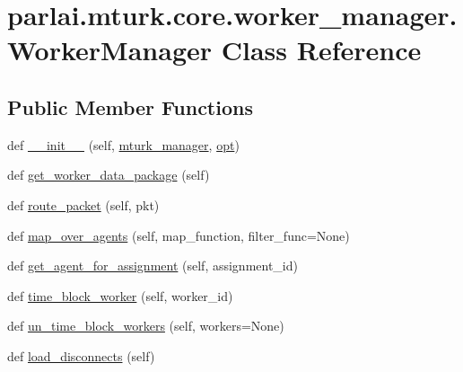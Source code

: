 \hypertarget{classparlai_1_1mturk_1_1core_1_1worker__manager_1_1WorkerManager}{}\section{parlai.\+mturk.\+core.\+worker\+\_\+manager.\+Worker\+Manager Class Reference}
\label{classparlai_1_1mturk_1_1core_1_1worker__manager_1_1WorkerManager}
\subsection*{Public Member Functions}
\begin{DoxyCompactItemize}
\item 
def \hyperlink{classparlai_1_1mturk_1_1core_1_1worker__manager_1_1WorkerManager_a3cb56395af2a5c89c048ee3f9b5b8f7a}{\+\_\+\+\_\+init\+\_\+\+\_\+} (self, \hyperlink{classparlai_1_1mturk_1_1core_1_1worker__manager_1_1WorkerManager_a90e4c41010915289fa5e8e1fb0572623}{mturk\+\_\+manager}, \hyperlink{classparlai_1_1mturk_1_1core_1_1worker__manager_1_1WorkerManager_a69b6fcf739bcdaf914fe524772738309}{opt})
\item 
def \hyperlink{classparlai_1_1mturk_1_1core_1_1worker__manager_1_1WorkerManager_ae583d18246beaa4e75c2d1d539fe77ad}{get\+\_\+worker\+\_\+data\+\_\+package} (self)
\item 
def \hyperlink{classparlai_1_1mturk_1_1core_1_1worker__manager_1_1WorkerManager_a829bf9d74d9afb0277c11347745ac6db}{route\+\_\+packet} (self, pkt)
\item 
def \hyperlink{classparlai_1_1mturk_1_1core_1_1worker__manager_1_1WorkerManager_a252814b16fd59e725345146e6004e90a}{map\+\_\+over\+\_\+agents} (self, map\+\_\+function, filter\+\_\+func=None)
\item 
def \hyperlink{classparlai_1_1mturk_1_1core_1_1worker__manager_1_1WorkerManager_aa60e04ed5327e2b3dc9f886a17352e72}{get\+\_\+agent\+\_\+for\+\_\+assignment} (self, assignment\+\_\+id)
\item 
def \hyperlink{classparlai_1_1mturk_1_1core_1_1worker__manager_1_1WorkerManager_a95b104ab69a0c75312657ce77842a690}{time\+\_\+block\+\_\+worker} (self, worker\+\_\+id)
\item 
def \hyperlink{classparlai_1_1mturk_1_1core_1_1worker__manager_1_1WorkerManager_af4c5d947d5477e2b5a7bd6167e125ba9}{un\+\_\+time\+\_\+block\+\_\+workers} (self, workers=None)
\item 
def \hyperlink{classparlai_1_1mturk_1_1core_1_1worker__manager_1_1WorkerManager_aac0a3b7f87f3f60035cbb35155ea480d}{load\+\_\+disconnects} (self)

\end{DoxyCompactItemize}
